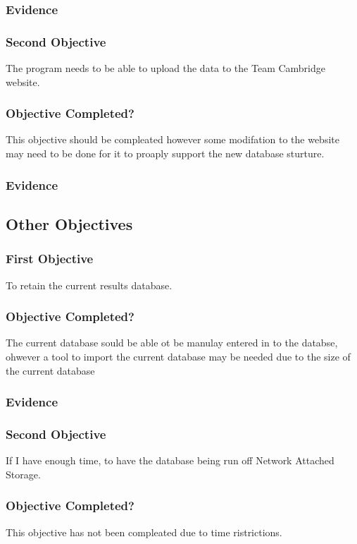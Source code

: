 \subsubsection{Evidence}

\subsubsection{Second Objective}
The program needs to be able to upload the data to the Team Cambridge website.
\subsubsection{Objective Completed?}
This objective should be compleated however some modifation to the website may need to be done for it to proaply support the new database sturture.
\subsubsection{Evidence}

\subsection{Other Objectives}
\subsubsection{First Objective}
To retain the current results database.
\subsubsection{Objective Completed?}
The current database sould be able ot be manulay entered in to the databse, ohwever a tool to import the current database may be needed due to the size of the current database
\subsubsection{Evidence}

\subsubsection{Second Objective}
If I have enough time, to have the database being run off Network Attached Storage.
\subsubsection{Objective Completed?}
This objective has not been compleated due to time ristrictions.

